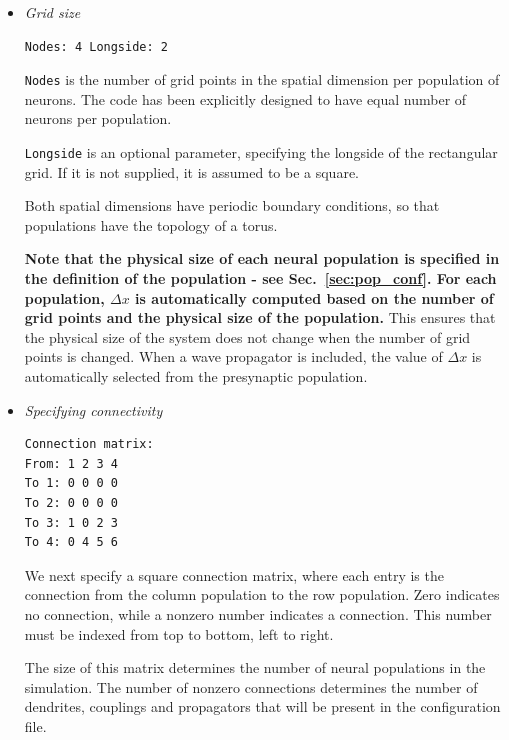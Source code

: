 \documentclass[12pt,a4paper]{article}
\newcommand{\type}[1]{{\small\small\tt #1} }
\begin{document}
\begin{itemize}
Second order requires smooth inputs: stimuli with jumps (\type{PulseRect}, \type{Burst}) give first-order errors near each jump with either scheme, and white noise converges in its statistics rather than path by path. Modules that integrate their own state with their inputs held constant over a step remain first order: the plastic couplings (\type{CaDP}, \type{BCM}, \type{BCM-Spatial}), the \type{Bursting} and \type{GlutamateResponse} firing responses, and \type{WaveLegacy}. The \type{Ramp} and \type{DiffArctan} couplings evaluate $\nu_{ab}$ one step ahead of $\phi_{ab}$, which is first order while $\nu_{ab}$ changes, and \type{Ramp} dendrites hold their rates constant within a step (at its midpoint). The spatial error of \type{Wave} depends on $\Delta x$ and is unaffected.
\item  {\em Grid size}
\begin{lstlisting}
Nodes: 4 Longside: 2
\end{lstlisting}
\type{Nodes} is the number of grid points in the spatial dimension per population of neurons. The code has been explicitly designed to have equal number of neurons per population.

\type{Longside} is an optional parameter, specifying the longside of the rectangular grid. If it is not supplied, it is assumed to be a square.

Both spatial dimensions have periodic boundary conditions, so that populations have the topology of a torus.

{\bf Note that the physical size of each neural population is specified in the definition of the population - see Sec.~\ref{sec:pop_conf}. For each population, $\Delta x$ is automatically computed based on the number of grid points and the physical size of the population.} This ensures that the physical size of the system does not change when the number of grid points is changed. When a wave propagator is included, the value of $\Delta x$ is automatically selected from the presynaptic population.

\item {\em Specifying connectivity}
\begin{lstlisting}
Connection matrix:
From: 1 2 3 4
To 1: 0 0 0 0
To 2: 0 0 0 0
To 3: 1 0 2 3
To 4: 0 4 5 6
\end{lstlisting}
We next specify a square connection matrix, where each entry is the connection from the column population to the row population. Zero indicates no connection, while a nonzero number indicates a connection. This number must be indexed from top to bottom, left to right.

The size of this matrix determines the number of neural populations in the simulation. The number of nonzero connections determines the number of dendrites, couplings and propagators that will be present in the configuration file.
\end{itemize}
\end{document}
